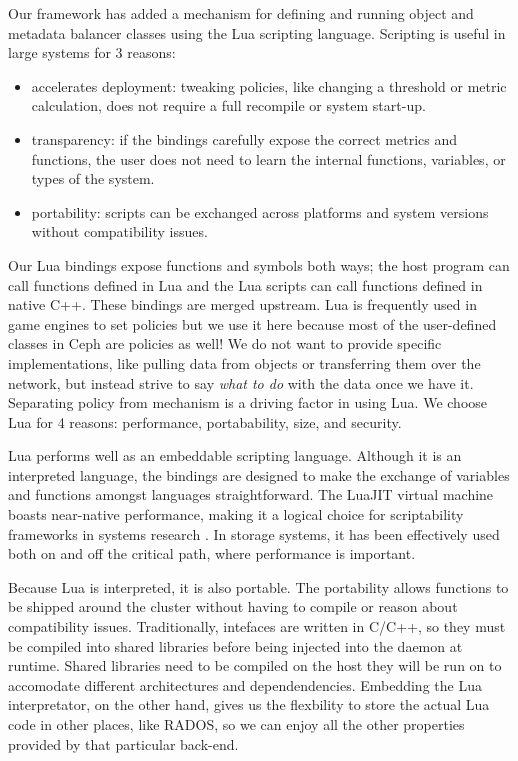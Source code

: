 \documentclass[10pt,twocolumn]{article}
\begin{document}
Our framework has added a mechanism for defining and running object and
metadata balancer classes using the Lua scripting language. Scripting is
useful in large systems for 3 reasons:

\begin{itemize}
\item
  accelerates deployment: tweaking policies, like changing a threshold
  or metric calculation, does not require a full recompile or system
  start-up.
\item
  transparency: if the bindings carefully expose the correct metrics and
  functions, the user does not need to learn the internal functions,
  variables, or types of the system.
\item
  portability: scripts can be exchanged across platforms and system
  versions without compatibility issues.
\end{itemize}

Our Lua bindings expose functions and symbols both ways; the host
program can call functions defined in Lua and the Lua scripts can call
functions defined in native C++. These bindings are merged upstream. Lua
is frequently used in game engines to set policies but we use it here
because most of the user-defined classes in Ceph are policies as well!
We do not want to provide specific implementations, like pulling data
from objects or transferring them over the network, but instead strive
to say \emph{what to do} with the data once we have it. Separating
policy from mechanism is a driving factor in using Lua. We choose Lua
for 4 reasons: performance, portabability, size, and security.

Lua performs well as an embeddable scripting language. Although it is an
interpreted language, the bindings are designed to make the exchange of
variables and functions amongst languages straightforward. The LuaJIT
virtual machine boasts near-native performance, making it a logical
choice for scriptability frameworks in systems research
\cite{neto:dls14-luaos}. In storage systems, it has been effectively
used both on \cite{grawinkel:pdsw2012-lua,watkins2013:bdmc13-in-vivo} and off
\cite{sevilla:sc15-mantle} the critical path, where performance is
important.

Because Lua is interpreted, it is also portable. The portability allows
functions to be shipped around the cluster without having to compile or
reason about compatibility issues. Traditionally, intefaces are written
in C/C++, so they must be compiled into shared libraries before being
injected into the daemon at runtime. Shared libraries need to be
compiled on the host they will be run on to accomodate different
architectures and dependendencies. Embedding the Lua interpretator, on
the other hand, gives us the flexbility to store the actual Lua code in
other places, like RADOS, so we can enjoy all the other properties
provided by that particular back-end.
\end{document}
